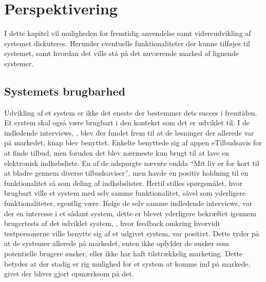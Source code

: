 \chapter{Perspektivering}
I dette kapitel vil muligheden for fremtidig anvendelse samt videreudvikling af systemet diskuteres.
Herunder eventuelle funktionaliteter der kunne tilføjes til systemet, samt hvordan det ville stå på det nuværende marked af lignende systemer.

\section{Systemets brugbarhed}
Udvikling af et system er ikke det eneste der bestemmer dets succes i fremtiden.
Et system skal også være brugbart i den kontekst som det er udviklet til.
I de indledende interviews, , blev der fundet frem til at de løsninger der allerede var på markedet, knap blev benyttet.
Enkelte benyttede sig af appen eTilbudsavis for at finde tilbud, men foruden det blev nærmeste kun brugt til at lave en elektronisk indkøbsliste.
En af de adspurgte nævnte endda ``Mit liv er for kort til at bladre gennem diverse tilbudsaviser'', men havde en positiv holdning til en funktionalitet så som deling af indkøbslister.
Hertil stilles spørgsmålet, hvor brugbart ville et system med selv samme funktionalitet, såvel som yderligere funktionaliteter, egentlig være.
Ifølge de selv samme indledende interviews, var der en interesse i et sådant system, dette er blevet yderligere bekræftet igennem brugertests af det udviklet system, , hvor feedback omkring hvorvidt testpersonerne ville benytte sig af et udgivet system, var positivt.
Dette tyder på at de systemer allerede på markedet, enten ikke opfylder de ønsker som potentielle brugere ønsker, eller ikke har haft tilstrækkelig marketing. 
Dette betyder at der stadig er rig mulighed for et system at komme ind på markede, givet der bliver gjort opmærksom på det.


